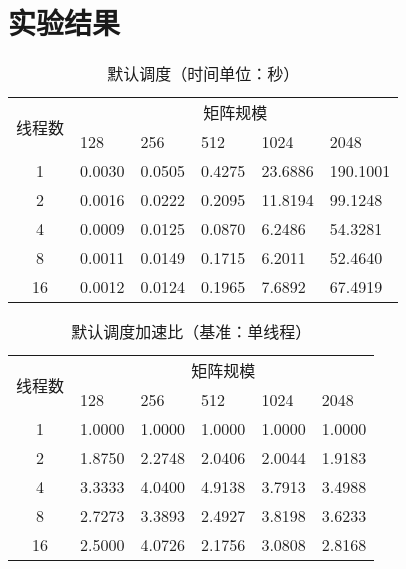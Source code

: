 \documentclass{SYSUReport}
\begin{document}
\section{实验结果}
\begin{table}[H]
    \centering
    \caption{默认调度（时间单位：秒）}
    \label{表1}
    \begin{tabular}{|c|lllll|}
    \hline
    \multirow{2}{*}{线程数} & \multicolumn{5}{c|}{矩阵规模} \\ \cline{2-6} 
    & \multicolumn{1}{l|}{128} & \multicolumn{1}{l|}{256} & \multicolumn{1}{l|}{512} & \multicolumn{1}{l|}{1024} & 2048 \\ \hline
    1  & \multicolumn{1}{l|}{0.0030} & \multicolumn{1}{l|}{0.0505} & \multicolumn{1}{l|}{0.4275} & \multicolumn{1}{l|}{23.6886} & 190.1001 \\ \hline
    2  & \multicolumn{1}{l|}{0.0016} & \multicolumn{1}{l|}{0.0222} & \multicolumn{1}{l|}{0.2095} & \multicolumn{1}{l|}{11.8194} & 99.1248 \\ \hline
    4  & \multicolumn{1}{l|}{0.0009} & \multicolumn{1}{l|}{0.0125} & \multicolumn{1}{l|}{0.0870} & \multicolumn{1}{l|}{6.2486} & 54.3281 \\ \hline
    8  & \multicolumn{1}{l|}{0.0011} & \multicolumn{1}{l|}{0.0149} & \multicolumn{1}{l|}{0.1715} & \multicolumn{1}{l|}{6.2011} & 52.4640 \\ \hline
    16 & \multicolumn{1}{l|}{0.0012} & \multicolumn{1}{l|}{0.0124} & \multicolumn{1}{l|}{0.1965} & \multicolumn{1}{l|}{7.6892} & 67.4919 \\ \hline
    \end{tabular}
    \end{table}
    \begin{table}[H]
        \centering
        \caption{默认调度加速比（基准：单线程）}
        \label{表1-加速比}
        \begin{tabular}{|c|lllll|}
        \hline
        \multirow{2}{*}{线程数} & \multicolumn{5}{c|}{矩阵规模} \\ \cline{2-6} 
         & \multicolumn{1}{l|}{128} & \multicolumn{1}{l|}{256} & \multicolumn{1}{l|}{512} & \multicolumn{1}{l|}{1024} & 2048 \\ \hline
        1  & \multicolumn{1}{l|}{1.0000} & \multicolumn{1}{l|}{1.0000} & \multicolumn{1}{l|}{1.0000} & \multicolumn{1}{l|}{1.0000} & 1.0000 \\ \hline
        2  & \multicolumn{1}{l|}{1.8750} & \multicolumn{1}{l|}{2.2748} & \multicolumn{1}{l|}{2.0406} & \multicolumn{1}{l|}{2.0044} & 1.9183 \\ \hline
        4  & \multicolumn{1}{l|}{3.3333} & \multicolumn{1}{l|}{4.0400} & \multicolumn{1}{l|}{4.9138} & \multicolumn{1}{l|}{3.7913} & 3.4988 \\ \hline
        8  & \multicolumn{1}{l|}{2.7273} & \multicolumn{1}{l|}{3.3893} & \multicolumn{1}{l|}{2.4927} & \multicolumn{1}{l|}{3.8198} & 3.6233 \\ \hline
        16 & \multicolumn{1}{l|}{2.5000} & \multicolumn{1}{l|}{4.0726} & \multicolumn{1}{l|}{2.1756} & \multicolumn{1}{l|}{3.0808} & 2.8168 \\ \hline
        \end{tabular}
        \end{table}
\end{document}
